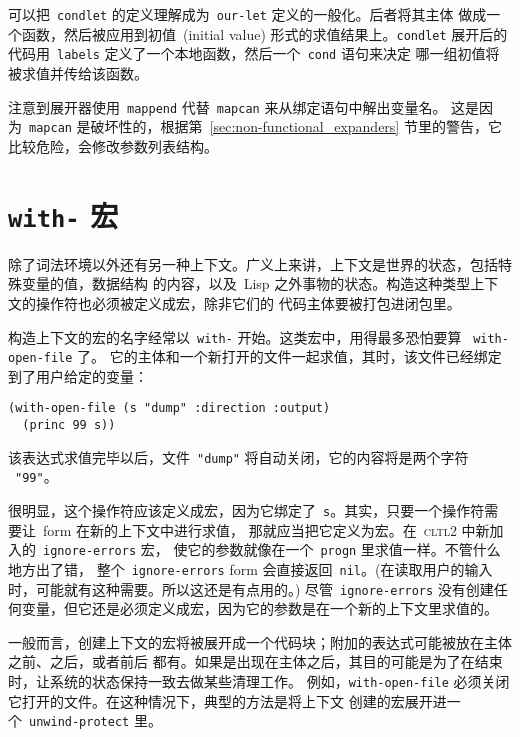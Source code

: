 可以把~\texttt{condlet} 的定义理解成为~\texttt{our-let} 定义的一般化。后者将其主体
做成一个函数，然后被应用到初值~(initial value) 形式的求值结果上。\texttt{condlet}
展开后的代码用~\texttt{labels} 定义了一个本地函数，然后一个~\texttt{cond} 语句来决定
哪一组初值将被求值并传给该函数。

注意到展开器使用~\texttt{mappend} 代替~\texttt{mapcan} 来从绑定语句中解出变量名。
这是因为~\texttt{mapcan} 是破坏性的，根据第~\ref{sec:non-functional_expanders}
节里的警告，它比较危险，会修改参数列表结构。

\section{\texttt{with-} 宏}
\label{sec:the_with_macro}

除了词法环境以外还有另一种上下文。广义上来讲，上下文是世界的状态，包括特殊变量的值，数据结构
的内容，以及~Lisp 之外事物的状态。构造这种类型上下文的操作符也必须被定义成宏，除非它们的
代码主体要被打包进闭包里。

构造上下文的宏的名字经常以~\texttt{with-} 开始。这类宏中，用得最多恐怕要算
~\texttt{with-open-file} 了。
它的主体和一个新打开的文件一起求值，其时，该文件已经绑定到了用户给定的变量：
\begin{lstlisting}
(with-open-file (s "dump" :direction :output)
  (princ 99 s))
\end{lstlisting}
该表达式求值完毕以后，文件~\texttt{"dump"} 将自动关闭，它的内容将是两个字符
~\texttt{"99"}。

很明显，这个操作符应该定义成宏，因为它绑定了~\texttt{s}。其实，只要一个操作符需要让~form 在新的上下文中进行求值，
那就应当把它定义为宏。在~\textsc{cltl}2 中新加入的~\texttt{ignore-errors} 宏，
使它的参数就像在一个~\texttt{progn} 里求值一样。不管什么地方出了错，
整个~\texttt{ignore-errors} form 会直接返回~\texttt{nil}。(在读取用户的输入时，可能就有这种需要。所以这还是有点用的。) 
尽管~\texttt{ignore-errors} 没有创建任何变量，但它还是必须定义成宏，因为它的参数是在一个新的上下文里求值的。

一般而言，创建上下文的宏将被展开成一个代码块；附加的表达式可能被放在主体之前、之后，或者前后
都有。如果是出现在主体之后，其目的可能是为了在结束时，让系统的状态保持一致\pozhehao{}去做某些清理工作。
例如，\texttt{with-open-file} 必须关闭它打开的文件。在这种情况下，典型的方法是将上下文
创建的宏展开进一个~\texttt{unwind-protect} 里。

